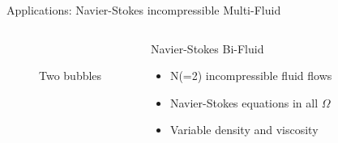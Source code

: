\documentclass[final,utf8,,hyperref={pdfpagelabels=false}]{beamer}
\newcommand{\goodgap}{%
  \hspace{\subfigtopskip}%
  \hspace{\subfigbottomskip}}
\begin{document}
\begin{frame}[containsverbatim]{}
\begin{columns}[c]
\begin{block}{Applications: Navier-Stokes incompressible Multi-Fluid}
\begin{columns}[t]
\begin{column}{.48\textwidth}
\begin{figure}
      \\
      \goodgap
      \caption{Two bubbles}
      \label{fig:1}
    \end{figure}
      \end{column}
      \begin{column}{.48\textwidth}
          \begin{block}{Navier-Stokes Bi-Fluid}
            \begin{itemize}
            \item N(=2) incompressible fluid flows
            \item Navier-Stokes equations in all  $\Omega$
            \item Variable density and viscosity
              

\end{itemize}
\end{block}
\end{column}
\end{columns}
\end{block}
\end{columns}
\end{frame}
\end{document}
